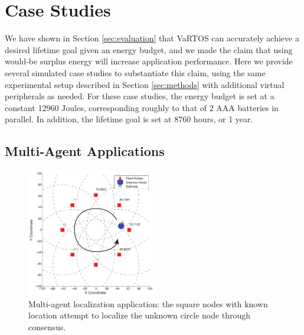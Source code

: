 \section{Case Studies}
\label{sec:casestudies}

We have shown in Section \ref{sec:evaluation} that VaRTOS can accurately achieve a desired lifetime goal given an energy budget, and we made the claim that using would-be surplus energy will increase application performance.  Here we provide several simulated case studies to substantiate this claim, using the same experimental setup described in Section \ref{sec:methods} with additional virtual peripherals as needed. For these case studies, the energy budget is set at a constant 12960 Joules, corresponding roughly to that of 2 AAA batteries in parallel.  In addition, the lifetime goal is set at 8760 hours, or 1 year. 

\subsection{Multi-Agent Applications}
\label{sec:casestudies:localization}

\begin{figure}
\centering
\includegraphics[width=0.5\textwidth]{figures/localization_snapshot2}
\caption{\label{fig:loc_overview}Multi-agent localization application: the square nodes with known location attempt to localize the unknown circle node through consensus. }
\end{figure}


